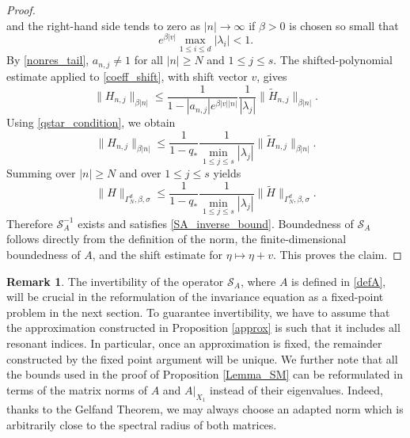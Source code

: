\documentclass{amsart}
\theoremstyle{plain}
\theoremstyle{definition}
\newtheorem{remark}[theorem]{Remark}
\begin{document}
\begin{proof}
\begin{equation}
\end{equation}
and the right-hand side tends to zero as $|n|\to\infty$ if $\beta>0$ is chosen so small that
\begin{equation}
        e^{\beta |v|}\max_{1\leq i\leq d}|\lambda_i|<1.
\end{equation}
By \eqref{nonres_tail}, $a_{n,j}\ne1$ for all $|n|\geq N$ and $1\leq j\leq s$.
The shifted-polynomial estimate applied to \eqref{coeff_shift}, with shift vector $v$, gives
\begin{equation}\label{coeff_inverse_bound}
        \|H_{n,j}\|_{\beta |n|}
        \le
        \frac{1}{1-|a_{n,j}|e^{\beta |v||n|}}
        \frac{1}{|\lambda_j|}
        \|\widetilde H_{n,j}\|_{\beta |n|}.
\end{equation}
Using \eqref{qstar_condition}, we obtain
\begin{equation}
        \|H_{n,j}\|_{\beta |n|}
        \le
        \frac{1}{1-q_*}
        \frac{1}{\min_{1\leq j\leq s}|\lambda_j|}
        \|\widetilde H_{n,j}\|_{\beta |n|}.
\end{equation}
Summing over $|n|\geq N$ and over $1\leq j\leq s$ yields
\begin{equation}
        \|H\|_{\Gamma_N^d,\beta,\sigma}
        \le
        \frac{1}{1-q_*}
        \frac{1}{\min_{1\leq j\leq s}|\lambda_j|}
        \|\widetilde H\|_{\Gamma_N^d,\beta,\sigma}.
\end{equation}
Therefore $\mathcal S_A^{-1}$ exists and satisfies \eqref{SA_inverse_bound}. Boundedness
of $\mathcal S_A$ follows directly from the definition of the norm, the finite-dimensional
boundedness of $A$, and the shift estimate for $\eta\mapsto\eta+v$. This proves the claim.
\end{proof}



\begin{remark}
    The invertibility of the operator $\mathcal{S}_A$, where $A$ is defined in \eqref{defA}, will be crucial in the reformulation of the invariance equation as a fixed-point problem in the next section. To guarantee invertibility, we have to assume that the approximation constructed in Proposition \ref{approx} is such that it includes all resonant indices.
    In particular, once an approximation is fixed, the remainder constructed by the fixed point argument will be unique. We further note that all the bounds used in the proof of Proposition \ref{Lemma_SM} can be reformulated in terms of the matrix norms of $A$ and $A|_{X_1}$ instead of their eigenvalues. Indeed, thanks to the Gelfand Theorem, we may always choose an adapted norm which is arbitrarily close to the spectral radius of both matrices. 
\end{remark}
\end{document}
